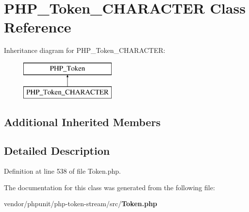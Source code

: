 \section{P\+H\+P\+\_\+\+Token\+\_\+\+C\+H\+A\+R\+A\+C\+T\+E\+R Class Reference}
\label{class_p_h_p___token___c_h_a_r_a_c_t_e_r}
Inheritance diagram for P\+H\+P\+\_\+\+Token\+\_\+\+C\+H\+A\+R\+A\+C\+T\+E\+R\+:\begin{figure}[H]
\begin{center}
\leavevmode
\includegraphics[height=2.000000cm]{class_p_h_p___token___c_h_a_r_a_c_t_e_r}
\end{center}
\end{figure}
\subsection*{Additional Inherited Members}


\subsection{Detailed Description}


Definition at line 538 of file Token.\+php.



The documentation for this class was generated from the following file\+:\begin{DoxyCompactItemize}
\item 
vendor/phpunit/php-\/token-\/stream/src/{\bf Token.\+php}\end{DoxyCompactItemize}
